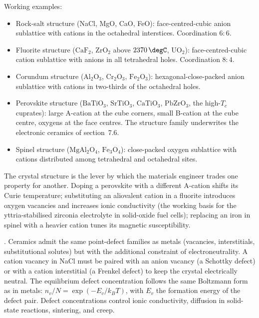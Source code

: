 Working examples:
\begin{itemize}[leftmargin=*]
\item Rock-salt structure (NaCl, MgO, CaO, FeO): face-centred-cubic
  anion sublattice with cations in the octahedral interstices.
  Coordination $6:6$.
\item Fluorite structure ($\mathrm{CaF_2}$, $\mathrm{ZrO_2}$ above
  $2370\,\degC$, $\mathrm{UO_2}$): face-centred-cubic cation
  sublattice with anions in all tetrahedral holes. Coordination $8:4$.
\item Corundum structure ($\mathrm{Al_2O_3}$, $\mathrm{Cr_2O_3}$,
  $\mathrm{Fe_2O_3}$): hexagonal-close-packed anion sublattice with
  cations in two-thirds of the octahedral holes.
\item Perovskite structure ($\mathrm{BaTiO_3}$, $\mathrm{SrTiO_3}$,
  $\mathrm{CaTiO_3}$, $\mathrm{PbZrO_3}$, the high-$T_c$ cuprates):
  large A-cation at the cube corners, small B-cation at the cube
  centre, oxygens at the face centres. The structure family
  underwrites the electronic ceramics of section~7.6.
\item Spinel structure ($\mathrm{MgAl_2O_4}$, $\mathrm{Fe_3O_4}$):
  close-packed oxygen sublattice with cations distributed among
  tetrahedral and octahedral sites.
\end{itemize}

The crystal structure is the lever by which the materials engineer
trades one property for another. Doping a perovskite with a different
A-cation shifts its Curie temperature; substituting an aliovalent
cation in a fluorite introduces oxygen vacancies and increases ionic
conductivity (the working basis for the yttria-stabilised zirconia
electrolyte in solid-oxide fuel cells); replacing an iron in spinel
with a heavier cation tunes its magnetic susceptibility.

. Ceramics admit the same point-defect
families as metals (vacancies, interstitials, substitutional solutes)
but with the additional constraint of electroneutrality. A cation
vacancy in NaCl must be paired with an anion vacancy (a Schottky
defect) or with a cation interstitial (a Frenkel defect) to keep the
crystal electrically neutral. The equilibrium defect concentration
follows the same Boltzmann form as in metals:
$n_v/N = \exp(-E_v / k_B T)$, with $E_v$ the formation energy of the
defect pair. Defect concentrations control ionic conductivity, diffusion
in solid-state reactions, sintering, and creep.

